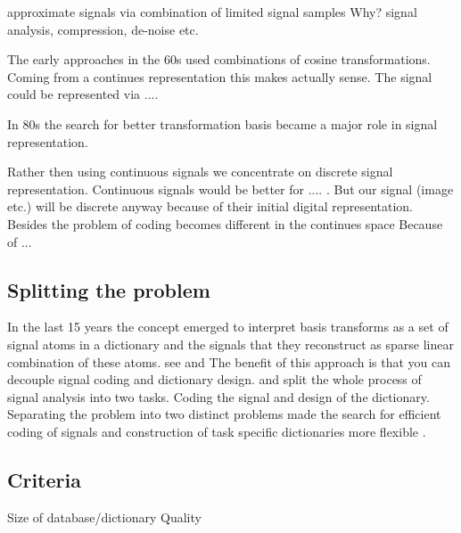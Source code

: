 approximate signals via combination of limited signal samples
Why?
signal analysis, compression, de-noise etc.

The early approaches in the 60s used combinations of cosine transformations. Coming from a continues representation this makes 
actually sense. The signal could be represented via ....

In 80s the search for better transformation basis became a major role in signal representation. \cite{}

Rather then using continuous signals we concentrate on discrete signal representation.
Continuous signals would be better for .... . But our signal (image etc.) will be discrete anyway because of their initial digital representation. 
Besides the problem of coding becomes different in the continues space \cite{} Because of ...

\subsection{Splitting the problem}
\cite{Rubinstein2010}
In the last 15 years the concept emerged to interpret basis transforms as a set of signal atoms in a dictionary and the signals 
that they reconstruct as sparse linear combination of these atoms.
see \cite{Olshausen1997} and \cite{}
The benefit of this approach is that you can decouple signal coding and dictionary design.
and split the whole process of signal analysis into two tasks. Coding the signal and design of the dictionary.
Separating the problem into two distinct problems made the search for efficient coding of signals and construction of task specific dictionaries more flexible \cite{?}.

\subsection{Criteria}

Size of database/dictionary
Quality





